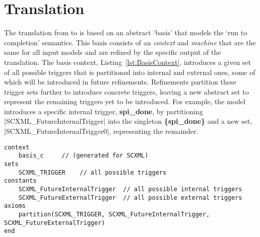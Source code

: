 
\section{\SCXML Translation}
\label{sec:translation}

The translation from \iUMLB to \EventB is based on an abstract `basis' that models the `run to completion' semantics. 
This basis consists of an \EventB \emph{context} and \emph{machine} that are the same for all input models and are refined by the specific output of the translation.  
The basis context, Listing~\ref{lst:BasisContext}, introduces a given set of all possible triggers that is partitioned into internal and external ones, some of which will be introduced in future refinements. 
Refinements partition these trigger sets further to introduce concrete triggers, leaving a new abstract set to represent the remaining triggers yet to be introduced. 
For example, the \IDS model introduces a specific internal trigger, \textbf{spi\_done},  by partitioning |SCXML_FutureInternalTrigger| into the singleton \textbf{\{spi\_done\}} and a new set, |SCXML_FutureInternalTrigger0|, representing the remainder. 

\begin{lstlisting}[caption={Abstract basis context},label={lst:BasisContext}, language=Event-B, escapechar=|, frame=single, basicstyle=\rmfamily\scriptsize, belowskip=-2.0 \baselineskip, float=t]
context
	basis_c 	// (generated for SCXML)
sets
	SCXML_TRIGGER	 // all possible triggers
constants
	SCXML_FutureInternalTrigger	 // all possible internal triggers
	SCXML_FutureExternalTrigger	 // all possible external triggers  
axioms
	partition(SCXML_TRIGGER, SCXML_FutureInternalTrigger, SCXML_FutureExternalTrigger) 
end
\end{lstlisting}	


